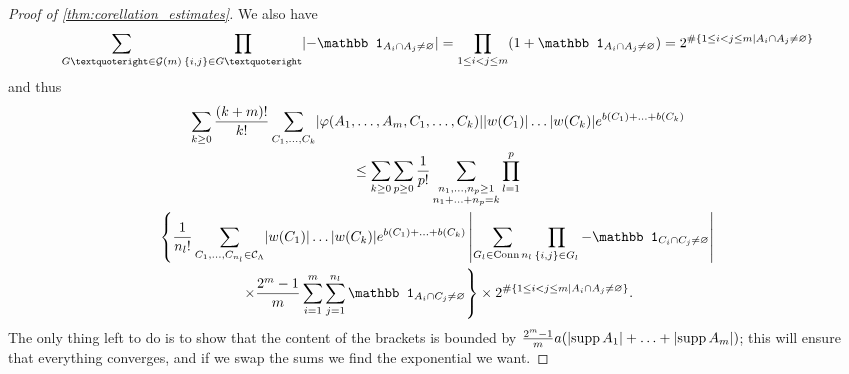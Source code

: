 \documentclass{article}
\DeclarePairedDelimiter\abs{\lvert}{\rvert}
\DeclareMathOperator{\Conn}{Conn}
\DeclareMathOperator{\supp}{supp}
\begin{document}
\begin{proof}[Proof of \cref{thm:corellation_estimates}]
        We also have
        $$
        \sum_{G’\in \mathcal G(m)}\prod_{\{i,j\}\in G’}\abs{-\mathbb 1_{A_i\cap A_j\neq\varnothing}} = \prod_{1\leq i< j\leq m}(1+\mathbb 1_{A_i\cap A_j\neq\varnothing})=2^{\#\{1\leq i<j\leq m\mid A_i\cap A_j\neq\varnothing\}}
        $$
        and thus 
        \begin{multline*}
            \sum_{k\geq 0}\frac{(k+m)!}{k!}\sum_{C_1,\ldots,C_k}\abs{\varphi(A_1,\ldots,A_m,C_1,\ldots,C_k)}\abs{w(C_1)}\ldots \abs{w(C_k)}e^{b(C_1)+\ldots+b(C_k)}\\\leq
            \sum_{k\geq 0}\sum_{p\geq 0}\frac 1 {p!} \sum_{\substack{n_1,\ldots,n_p\geq 1\\n_1+\ldots+n_p=k}}
                \prod_{l=1}^p \\
                \left\{\frac 1 {n_l!} \sum_{C_1,\ldots,C_{n_l}\in \mathcal C_\Lambda}
                \abs{w(C_1)}\ldots \abs{w(C_k)}e^{b(C_1)+\ldots+b(C_k)}
                \left| 
                    \sum_{G_l\in \Conn{n_l}}\prod_{\{i,j\}\in G_l}-\mathbb 1_{C_i\cap C_j\neq\varnothing}
                \right|\right.\\\left.
                \times \frac {2^m-1} m \sum_{i=1}^m\sum_{j=1}^{n_l}\mathbb 1_{A_i\cap C_{j}\neq\varnothing}
            \right\}
            \times 2^{\#\{1\leq i<j\leq m\mid A_i\cap A_j\neq\varnothing\}}.
        \end{multline*}
        The only thing left to do is to show that the content of the brackets is bounded by $
        \frac {2^m-1}{m}a(\abs{\supp A_1}+\ldots+\abs{\supp A_m})$; this will ensure that everything converges, and if we swap the sums we find the exponential we want.
\end{proof}
\end{document}
